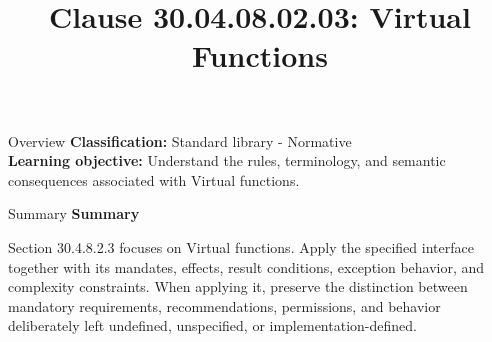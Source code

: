 \documentclass[10pt,letterpaper]{article}
\title{Clause 30.04.08.02.03: Virtual Functions}
\author{}
\date{}
\begin{document}
\maketitle
\begin{CornellOverviewBox}{Overview}
\textbf{Classification:} Standard library - Normative\\[2pt]
\textbf{Learning objective:} Understand the rules, terminology, and semantic consequences associated with Virtual functions.
\end{CornellOverviewBox}\begin{CornellSummaryBox}{Summary}
{\sffamily\bfseries\color{Accent} Summary}\par\vspace{3pt}Section 30.4.8.2.3 focuses on Virtual functions. Apply the specified interface together with its mandates, effects, result conditions, exception behavior, and complexity constraints. When applying it, preserve the distinction between mandatory requirements, recommendations, permissions, and behavior deliberately left undefined, unspecified, or implementation-defined.
\end{CornellSummaryBox}
\end{document}
